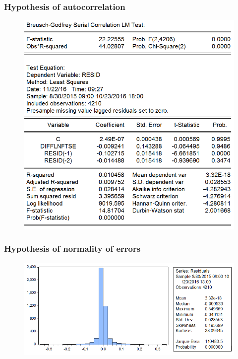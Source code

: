 \documentclass[11pt]{report}
\begin{document}
\subsubsection*{Hypothesis of autocorrelation}
\begin{figure}[!h]
\centering
\includegraphics[scale=0.5]{Appendix/chap3/3}
\end{figure}
\subsubsection*{Hypothesis of normality of errors}
\begin{figure}[!h]
\centering
\includegraphics[scale=1]{Appendix/chap3/4}
\end{figure}
\clearpage
\end{document}
